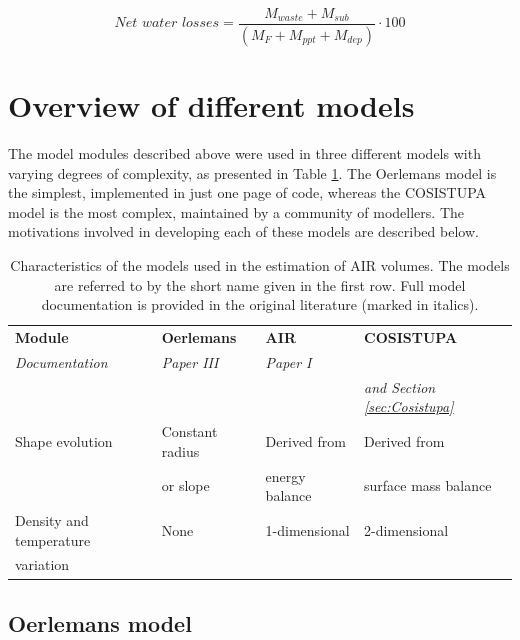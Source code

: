 \begin{equation} \textit{Net water losses} = \frac{M_{waste}+M_{sub}}{(M_F+M_{ppt}+M_{dep})} \cdot 100 \end{equation}

\section{Overview of different models}
\label{sec:MIP}

The model modules described above were used in three different models with varying degrees of complexity, as
presented in Table \ref{tab:MIP}. The Oerlemans model is the simplest, implemented in just one page of code, whereas
the COSISTUPA model is the most complex, maintained by a community of modellers. The motivations involved
in developing each of these models are described below.

\begin{table}[ht]
	\centering
  \caption{Characteristics of the models used in the estimation of AIR volumes. The models are referred to by
  the short name given in the first row. Full model documentation is provided in the original literature (marked in
  italics). }      

	\label{tab:MIP}
	\begin{tabular}{|llll|}
		\hline
		\textbf{Module}        & \textbf{Oerlemans} & \textbf{AIR} & \textbf{COSISTUPA}     \\ 
		\textit{Documentation} & \textit{Paper III} & \textit{Paper I} & \textit{\citet{sauterCOSIPYV1Opensource2020}} \\ 
		                       &                    &                  & \textit{and Section \ref{sec:Cosistupa}}     \\ \hline
		Shape evolution        & Constant radius     & Derived from  & Derived from        \\
                           & or slope            & energy balance & surface mass balance        \\\hline
		Density and temperature& None & 1-dimensional   & 2-dimensional   \\
		variation              &           &        & \\ \hline
	\end{tabular}
\end{table}

\subsection{Oerlemans model}

